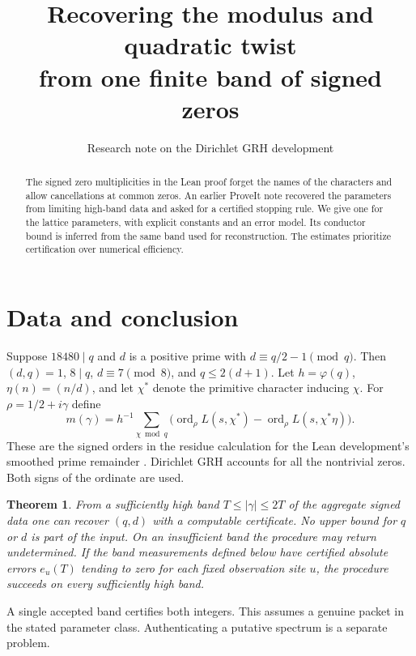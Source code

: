 \documentclass[11pt]{article}
\title{Recovering the modulus and quadratic twist\\from one finite band of signed zeros}
\author{Research note on the Dirichlet GRH development}\date{}
\newtheorem{theorem}{Theorem}\newtheorem{lemma}[theorem]{Lemma}
\begin{document}
\maketitle
\begin{abstract}
The signed zero multiplicities in the Lean proof forget the names of the
characters and allow cancellations at common zeros. An earlier ProveIt note
recovered the parameters from limiting high-band data and asked for a
certified stopping rule. We give one for the lattice parameters, with
explicit constants and an error model. Its conductor bound is inferred from
the same band used for reconstruction. The estimates prioritize certification over numerical efficiency.
\end{abstract}
\section{Data and conclusion}
Suppose $18480\mid q$ and $d$ is a positive prime with
$d\equiv q/2-1\pmod q$. Then $(d,q)=1$, $8\mid q$, $d\equiv7\pmod8$,
and $q\le 2(d+1)$. Let $h=\varphi(q)$, $\eta(n)=(n/d)$, and let
$\chi^*$ denote the primitive character inducing $\chi$. For
$\rho=1/2+i\gamma$ define
\[
 m(\gamma)=h^{-1}\sum_{\chi\bmod q}
 \bigl(\operatorname{ord}_\rho L(s,\chi^*)-
       \operatorname{ord}_\rho L(s,\chi^*\eta)\bigr).
\]
These are the signed orders in the residue calculation for the Lean
development's smoothed prime remainder \cite{lean}. Dirichlet GRH
accounts for all the nontrivial zeros. Both signs of the ordinate are used.
\begin{theorem}
From a sufficiently high band $T\le |\gamma|\le 2T$ of the aggregate
signed data one can recover $(q,d)$ with a computable certificate.
No upper bound for $q$ or $d$ is part of the input. On an insufficient
band the procedure may return \emph{undetermined}. If the band measurements
defined below have certified absolute errors $e_u(T)$ tending to zero for
each fixed observation site $u$, the procedure succeeds on every
sufficiently high band.
\end{theorem}
A single accepted band certifies both integers. This assumes a genuine packet
in the stated parameter class. Authenticating a putative spectrum is a separate problem.
\end{document}
